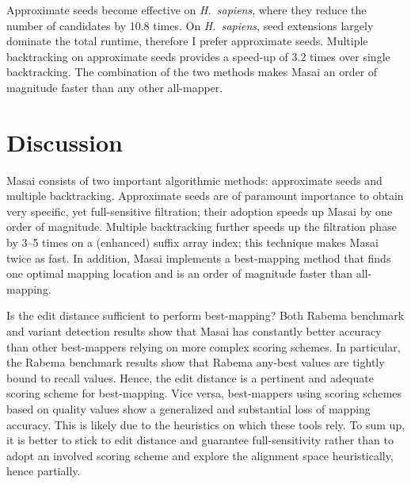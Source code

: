 Approximate seeds become effective on \emph{H.~sapiens}, where they reduce the number of candidates by 10.8 times. 
On \emph{H.~sapiens}, seed extensions largely dominate the total runtime, therefore I prefer approximate seeds.
Multiple backtracking on approximate seeds provides a speed-up of 3.2 times over single backtracking.
The combination of the two methods makes Masai an order of magnitude faster than any other all-mapper.

\begin{table*}[h]
  \center
  \caption[Masai filtration efficiency results]{
    \label{tab:masai:filtration}%
    Masai all-mapping filtration efficiency results.
    Filtering times include seeds indexing times.
    The best filtering schemes are in bold.
  }
  {
  \sffamily
  \footnotesize
  \renewcommand{\tabcolsep}{0.8ex}
  
  }
  \vspace{2mm}
\end{table*}


\section{Discussion}

Masai consists of two important algorithmic methods: approximate seeds and multiple backtracking.
Approximate seeds are of paramount importance to obtain very specific, yet full-sensitive filtration; their adoption speeds up Masai by one order of magnitude.
Multiple backtracking further speeds up the filtration phase by 3--5 times on a (enhanced) suffix array index; this technique makes Masai twice as fast.
In addition, Masai implements a best-mapping method that finds one optimal mapping location and is an order of magnitude faster than all-mapping.

Is the edit distance sufficient to perform best-mapping?
Both Rabema benchmark and variant detection results show that Masai has constantly better accuracy than other best-mappers relying on more complex scoring schemes.
In particular, the Rabema benchmark results show that Rabema any-best values are tightly bound to recall values.
Hence, the edit distance is a pertinent and adequate scoring scheme for best-mapping.
Vice versa, best-mappers using scoring schemes based on quality values show a generalized and substantial loss of mapping accuracy.
This is likely due to the heuristics on which these tools rely.
To sum up, it is better to stick to edit distance and guarantee full-sensitivity rather than to adopt an involved scoring scheme and explore the alignment space heuristically, hence partially.

